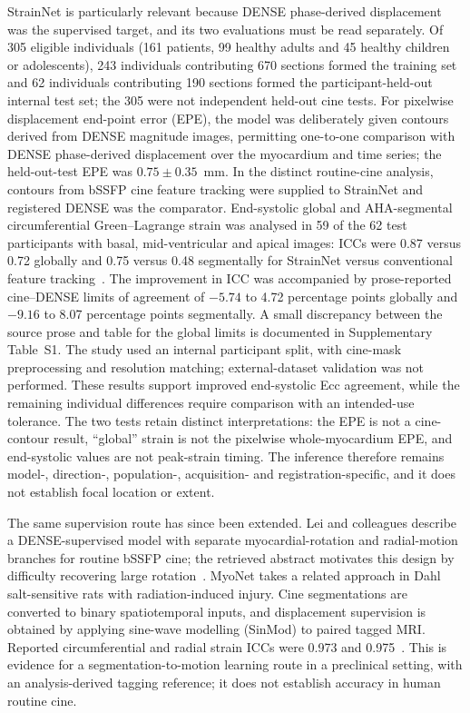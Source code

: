 StrainNet is particularly relevant because DENSE phase-derived displacement was the supervised target, and its two evaluations must be read separately. Of 305 eligible individuals (161 patients, 99 healthy adults and 45 healthy children or adolescents), 243 individuals contributing 670 sections formed the training set and 62 individuals contributing 190 sections formed the participant-held-out internal test set; the 305 were not independent held-out cine tests. For pixelwise displacement end-point error (EPE), the model was deliberately given contours derived from DENSE magnitude images, permitting one-to-one comparison with DENSE phase-derived displacement over the myocardium and time series; the held-out-test EPE was \(0.75\pm0.35\)~mm. In the distinct routine-cine analysis, contours from bSSFP cine feature tracking were supplied to StrainNet and registered DENSE was the comparator. End-systolic global and AHA-segmental circumferential Green--Lagrange strain was analysed in 59 of the 62 test participants with basal, mid-ventricular and apical images: ICCs were 0.87 versus 0.72 globally and 0.75 versus 0.48 segmentally for StrainNet versus conventional feature tracking~\cite{wang2023strainnet}. The improvement in ICC was accompanied by prose-reported cine--DENSE limits of agreement of \(-5.74\) to 4.72 percentage points globally and \(-9.16\) to 8.07 percentage points segmentally. A small discrepancy between the source prose and table for the global limits is documented in Supplementary Table~S1. The study used an internal participant split, with cine-mask preprocessing and resolution matching; external-dataset validation was not performed. These results support improved end-systolic Ecc agreement, while the remaining individual differences require comparison with an intended-use tolerance. The two tests retain distinct interpretations: the EPE is not a cine-contour result, ``global'' strain is not the pixelwise whole-myocardium EPE, and end-systolic values are not peak-strain timing. The inference therefore remains model-, direction-, population-, acquisition- and registration-specific, and it does not establish focal location or extent.

The same supervision route has since been extended. Lei and colleagues describe a DENSE-supervised model with separate myocardial-rotation and radial-motion branches for routine bSSFP cine; the retrieved abstract motivates this design by difficulty recovering large rotation~\cite{lei2025denserotation}. MyoNet takes a related approach in Dahl salt-sensitive rats with radiation-induced injury. Cine segmentations are converted to binary spatiotemporal inputs, and displacement supervision is obtained by applying sine-wave modelling (SinMod) to paired tagged MRI. Reported circumferential and radial strain ICCs were 0.973 and 0.975~\cite{an2026myonet}. This is evidence for a segmentation-to-motion learning route in a preclinical setting, with an analysis-derived tagging reference; it does not establish accuracy in human routine cine.

